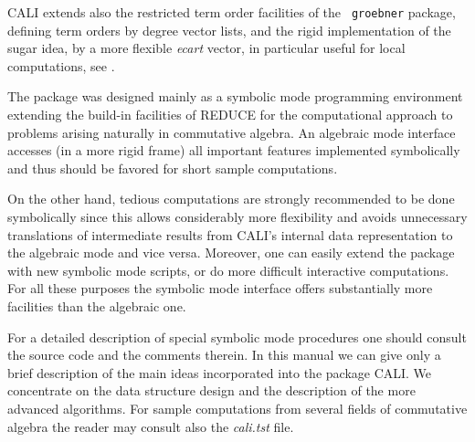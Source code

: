 \documentclass[a4paper,11pt]{article}
\newcommand{\ind}[1]{{\em #1}\index{#1}}
\begin{document}
CALI extends also the restricted term order facilities of the {\tt
groebner} package, defining term orders by degree vector lists, and 
the rigid implementation of the sugar idea, by a more flexible
\ind{ecart} vector, in particular useful for local computations, see
\cite{tcah}. 
\medskip

The package was designed mainly as a symbolic mode programming
environment extending the build-in facilities of REDUCE for the
computational approach to problems arising naturally in commutative
algebra. An algebraic mode interface accesses (in a more rigid frame)
all important features implemented symbolically and thus 
should be favored for short sample computations.

On the other hand, tedious computations are strongly recommended to
be done symbolically since this allows considerably more flexibility
and avoids unnecessary translations of intermediate results from
CALI's internal data representation to the algebraic mode and vice
versa. Moreover, one can easily extend the package with new symbolic
mode scripts, or do more difficult interactive computations. For all
these purposes the symbolic mode interface offers substantially more
facilities than the algebraic one.
\medskip

For a detailed description of special symbolic mode procedures one
should consult the source code and the comments therein. In this
manual we can give only a brief description of the main ideas
incorporated into the package CALI. We concentrate on the data
structure design and the description of the more advanced algorithms.
For sample computations from several fields of commutative algebra
the reader may consult also the {\em cali.tst} file.
\medskip
\end{document}
